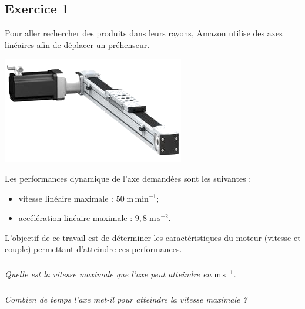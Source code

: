 \documentclass[10pt,fleqn]{book} %
\begin{document}

\vspace{8cm}
\pagestyle{fancy}
\thispagestyle{plain}


\def\columnseprulecolor{\color{ocre}}
\setlength{\columnseprule}{0.4pt} 
\begin{multicols}{2}

\section*{Exercice 1}

Pour aller rechercher des produits dans leurs rayons, Amazon utilise des axes linéaires afin de déplacer un préhenseur.
\begin{center}
\includegraphics[width=\linewidth]{images/fig_01}
\end{center}

Les performances dynamique de l'axe demandées sont les suivantes : 
\begin{itemize}
\item vitesse linéaire maximale : $50 \; \text{m}\,\text{min}^{-1}$;
\item accélération linéaire maximale : $9,8 \; \text{m}\, \text{s}^{-2}$.
\end{itemize}

\begin{obj}
L'objectif de ce travail est de déterminer les caractéristiques du moteur (vitesse et couple) permettant d'atteindre ces performances.
\end{obj}

\subparagraph{}
\textit{Quelle est la vitesse maximale que l'axe peut atteindre en  $\text{m}\, \text{s}^{-1}$.}

\subparagraph{}
\textit{Combien de temps l'axe met-il pour atteindre la vitesse maximale ?}


\end{multicols}
\end{document}
